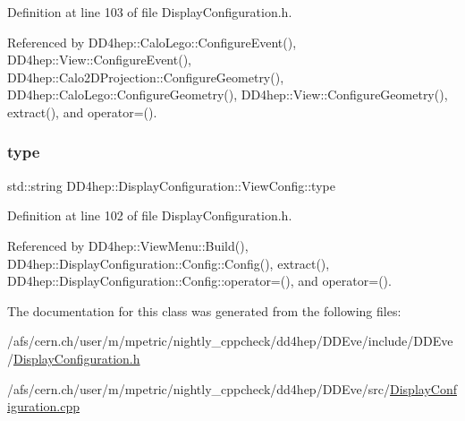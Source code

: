 Definition at line 103 of file Display\+Configuration.\+h.



Referenced by D\+D4hep\+::\+Calo\+Lego\+::\+Configure\+Event(), D\+D4hep\+::\+View\+::\+Configure\+Event(), D\+D4hep\+::\+Calo2\+D\+Projection\+::\+Configure\+Geometry(), D\+D4hep\+::\+Calo\+Lego\+::\+Configure\+Geometry(), D\+D4hep\+::\+View\+::\+Configure\+Geometry(), extract(), and operator=().

\hypertarget{class_d_d4hep_1_1_display_configuration_1_1_view_config_ae02fb914afdda0a021ff81d40c928844}{}\label{class_d_d4hep_1_1_display_configuration_1_1_view_config_ae02fb914afdda0a021ff81d40c928844} 
\subsubsection{\texorpdfstring{type}{type}}
{\footnotesize\ttfamily std\+::string D\+D4hep\+::\+Display\+Configuration\+::\+View\+Config\+::type}



Definition at line 102 of file Display\+Configuration.\+h.



Referenced by D\+D4hep\+::\+View\+Menu\+::\+Build(), D\+D4hep\+::\+Display\+Configuration\+::\+Config\+::\+Config(), extract(), D\+D4hep\+::\+Display\+Configuration\+::\+Config\+::operator=(), and operator=().



The documentation for this class was generated from the following files\+:\begin{DoxyCompactItemize}
\item 
/afs/cern.\+ch/user/m/mpetric/nightly\+\_\+cppcheck/dd4hep/\+D\+D\+Eve/include/\+D\+D\+Eve/\hyperlink{_display_configuration_8h}{Display\+Configuration.\+h}\item 
/afs/cern.\+ch/user/m/mpetric/nightly\+\_\+cppcheck/dd4hep/\+D\+D\+Eve/src/\hyperlink{_display_configuration_8cpp}{Display\+Configuration.\+cpp}\end{DoxyCompactItemize}
